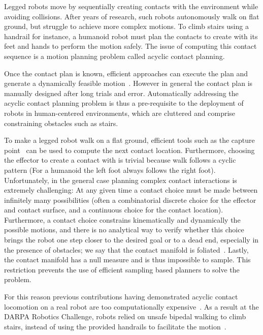 
Legged robots move by sequentially creating contacts with the environment while avoiding collisions.
After years of research, such robots autonomously walk on flat ground, but struggle to achieve more complex motions.
To climb stairs using a handrail for instance, a humanoid robot must plan the contacts to create with its feet and hands to perform the motion safely. The issue of computing this contact sequence is a motion planning problem called acyclic contact planning.

Once the contact plan is known, efficient approaches can execute the plan and generate a dynamically feasible motion~\citep{Carpentier2016}. However in general
the contact plan is manually designed after long trials and error. Automatically addressing the acyclic contact planning problem is thus a pre-requisite to the deployment of robots in human-centered environments, which are cluttered and comprise constraining obstacles such as stairs.

To make a legged robot walk on a flat ground, efficient tools such as the capture point~\citep{Pratt2006} can be used to compute the next contact location. Furthermore, choosing the effector to create a contact with is trivial because walk follows a cyclic pattern (For a humanoid the left foot always follows the right foot).
Unfortunately, in the general case planning complex contact interactions is extremely challenging:
At any given time a contact choice must be made between infinitely many possibilities (often a combinatorial discrete choice for the effector and contact surface, and a continuous choice for the contact location). Furthermore, a contact choice constrains kinematically and dynamically the possible motions, and there is no analytical way to verify whether this choice brings the robot one step closer to the desired goal or to a dead end, especially in the presence of obstacles; we say that the contact manifold is foliated~\citep{simeon-manipulation-04}. Lastly, the contact manifold has a null measure and is thus impossible to sample. This restriction prevents the use of efficient sampling based planners to solve the problem.


For this reason previous contributions having demonstrated acyclic contact locomotion on a real robot are too computationally expensive~\citep{Bretl:2006:MPM:1124573.1124585}. As a result at the DARPA Robotics Challenge, robots relied on unsafe bipedal walking to climb stairs, instead of using the provided handrails to facilitate the motion~\citep{atkensondarpa}. 

